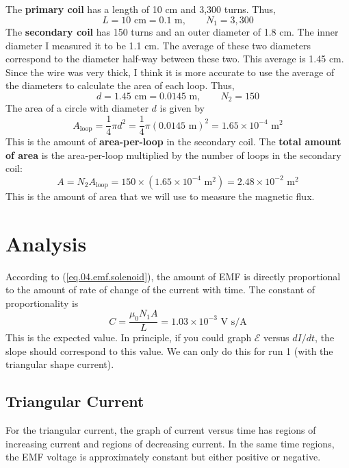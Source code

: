 The \textbf{primary coil} has a length of 10 cm and 3,300 turns. Thus,
\begin{equation}
	L = 10 \text{ cm} = 0.1 \text{ m}, \qquad N_{1} = 3,300
\end{equation}
The \textbf{secondary coil} has 150 turns and an outer diameter of 1.8 cm. The inner diameter I measured it to be 1.1 cm. The average of these two diameters correspond to the diameter half-way between these two. This average is 1.45 cm. Since the wire was very thick, I think it is more accurate to use the average of the diameters to calculate the area of each loop. Thus,
\begin{equation}
	d = 1.45 \text{ cm} = 0.0145 \text{ m}, \qquad N_{2} = 150
\end{equation}
The area of a circle with diameter $d$ is given by
\begin{equation}
	A_{\text{loop}} = \frac{1}{4} \pi d^{2} = \frac{1}{4} \pi (0.0145 \text{ m})^2 = 1.65 \times 10^{-4} \text{ m}^{2}
\end{equation}
This is the amount of \textbf{area-per-loop} in the secondary coil. The \textbf{total amount of area} is the area-per-loop multiplied by the number of loops in the secondary coil:
\begin{equation}
	A = N_{2} A_{\text{loop}} = 150 \times (1.65 \times 10^{-4} \text{ m}^{2}) = 2.48 \times 10^{-2} \text{ m}^{2}
\end{equation}
This is the amount of area that we will use to measure the magnetic flux.
\section{Analysis}
According to (\ref{eq.04.emf.solenoid}), the amount of EMF is directly proportional to the amount of rate of change of the current with time. The constant of proportionality is
\begin{equation}
	C = \frac{\mu_{0} N_{1} A}{L} = 1.03 \times 10^{-3} \text{ V s/A}
	\label{eq.04.slope}
\end{equation}
This is the expected value. In principle, if you could graph $\mathcal{E}$ versus $dI/dt$, the slope should correspond to this value. We can only do this for run 1 (with the triangular shape current).
\subsection{Triangular Current}
For the triangular current, the graph of current versus time has regions of increasing current and regions of decreasing current. In the same time regions, the EMF voltage is approximately constant but either positive or negative.

